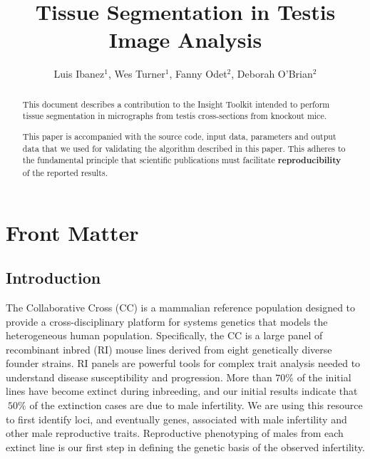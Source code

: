 \documentclass{InsightArticle}
\title{Tissue Segmentation in Testis Image Analysis}
\author{Luis Ibanez$^{1}$, Wes Turner$^{1}$, Fanny Odet$^{2}$, Deborah O'Brian$^{2}$}
\newcommand{\IJhandlerIDnumber}{3063}
\begin{document}
%
%
\IJhandlefooter{\IJhandlerIDnumber}


\ifpdf
\else
\fi


\maketitle


\ifhtml
\chapter*{Front Matter\label{front}}
\fi


\begin{abstract}
\noindent
This document describes a contribution to the Insight Toolkit intended to
perform tissue segmentation in micrographs from testis cross-sections from
knockout mice.

This paper is accompanied with the source code, input data, parameters and
output data that we used for validating the algorithm described in this paper.
This adheres to the fundamental principle that scientific publications must
facilitate \textbf{reproducibility} of the reported results.
\end{abstract}

\tableofcontents

\section{Introduction}

The Collaborative Cross (CC) is a mammalian reference population designed to
provide a cross-disciplinary platform for systems genetics that models the
heterogeneous human population.  Specifically, the CC is a large panel of
recombinant inbred (RI) mouse lines derived from eight genetically diverse
founder strains.  RI panels are powerful tools for complex trait analysis
needed to understand disease susceptibility and progression. More than $70\%$ of
the initial lines have become extinct during inbreeding, and our initial
results indicate that $~50\%$ of the extinction cases are due to male
infertility.  We are using this resource to first identify loci, and eventually
genes, associated with male infertility and other male reproductive traits.
Reproductive phenotyping of males from each extinct line is our first step in
defining the genetic basis of the observed infertility.
\end{document}
